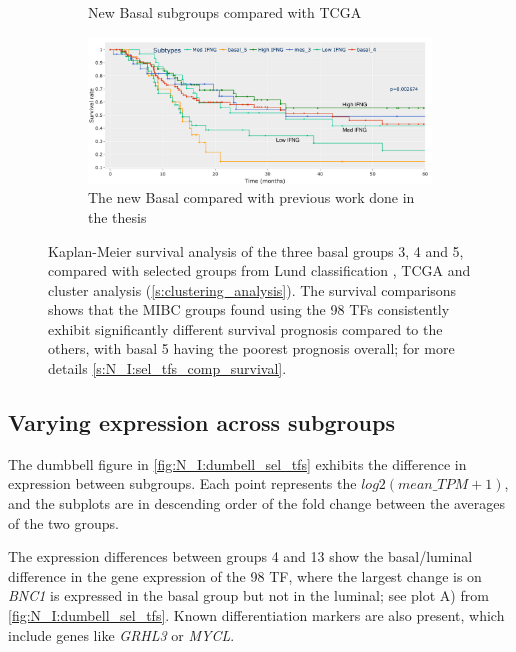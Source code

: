 \begin{figure}[!htb]
\begin{subfigure}[!t]{1.0\textwidth}
        \caption{New Basal subgroups compared with TCGA}
        \label{fig:N_I:sel_tfs_comp_tcga}
    \end{subfigure}
    \begin{subfigure}[!t]{1.0\textwidth}
        \includegraphics[width=1.0\textwidth,keepaspectratio]{Sections/Network_I/Resources/selective_pruning/sel_tfs/comp_leiden_survival_CA.png}
        \caption{The new Basal compared with previous work done in the thesis}
        \label{fig:N_I:sel_tfs_comp_CA}
    \end{subfigure}
    \caption[Survival comparison with TCGA, Lund and CA]{Kaplan-Meier survival analysis of the three basal groups 3, 4 and 5, compared with selected groups from Lund classification \citep{Marzouka2018-ge}, TCGA \citep{Robertson2017-mg} and cluster analysis (\cref{s:clustering_analysis}). The survival comparisons shows that the MIBC groups found using the 98 TFs consistently exhibit significantly different survival prognosis compared to the others, with basal 5 having the poorest prognosis overall; for more details \cref{s:N_I:sel_tfs_comp_survival}.}
    \label{fig:N_I:sel_tfs_cs_comp}
\end{figure}

\subsection{Varying expression across subgroups} \label{s:N_I:sel_tfs_ge}

The dumbbell figure in \cref{fig:N_I:dumbell_sel_tfs} exhibits the difference in expression between subgroups. Each point represents the $log2(mean\_TPM+1)$, and the subplots are in descending order of the fold change between the averages of the two groups.

The expression differences between groups 4 and 13 show the basal/luminal difference in the gene expression of the 98 TF, where the largest change is on \textit{BNC1} is expressed in the basal group but not in the luminal; see plot A) from \cref{fig:N_I:dumbell_sel_tfs}. Known differentiation markers are also present, which include genes like \textit{GRHL3} \citep{Ramal2024-ha} or \textit{MYCL}.

